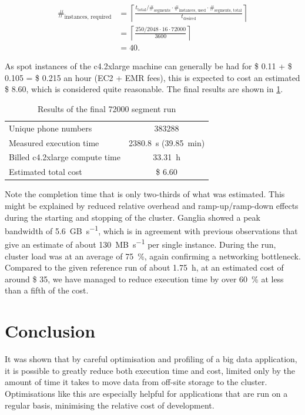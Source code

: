 \documentclass{article}
\begin{document}
\begin{align*}
	\#_{\text{instances, required}} &= \left\lceil\frac{t_{\text{total}} / \#_{\text{segments}} \cdot \#_{\text{instances, used}} \cdot \#_{\text{segments, total}}}{t_{\text{desired}}}\right\rceil \\
	&= \left\lceil\frac{250 / 2048 \cdot 16 \cdot 72000}{3600}\right\rceil \\
	&= 40.
\end{align*}

As spot instances of the c4.2xlarge machine can generally be had for \$ 0.11 + \$ 0.105 = \$ 0.215 an hour (EC2 + EMR fees), this is expected to cost an estimated \$ 8.60, which is considered quite reasonable.
The final results are shown in \cref{tab:final-run}.

\begin{table}[H]
	\centering
	\caption{Results of the final \num{72000} segment run}
	\label{tab:final-run}

	\begin{tabular}{lc}
	\toprule
	Unique phone numbers			& \num{383288} \\
	Measured execution time			& \SI{2380.8}{\second} (\SI{39.85}{\minute}) \\
	Billed c4.2xlarge compute time	& \SI{33.31}{\hour} \\
	Estimated total cost			& \$ 6.60 \\
	\bottomrule
	\end{tabular}
\end{table}

Note the completion time that is only two-thirds of what was estimated.
This might be explained by reduced relative overhead and ramp-up/ramp-down effects during the starting and stopping of the cluster.
Ganglia showed a peak bandwidth of \SI{5.6}{GB\per\second}, which is in agreement with previous observations that give an estimate of about \SI{130}{MB\per\second} per single instance.
During the run, cluster load was at an average of \SI{75}{\percent}, again confirming a networking bottleneck.
Compared to the given reference run of about \SI{1.75}{\hour}, at an estimated cost of around \$ 35, we have managed to reduce execution time by over \SI{60}{\percent} at less than a fifth of the cost.

\section{Conclusion}
It was shown that by careful optimisation and profiling of a big data application, it is possible to greatly reduce both execution time and cost, limited only by the amount of time it takes to move data from off-site storage to the cluster.
Optimisations like this are especially helpful for applications that are run on a regular basis, minimising the relative cost of development.
\end{document}
